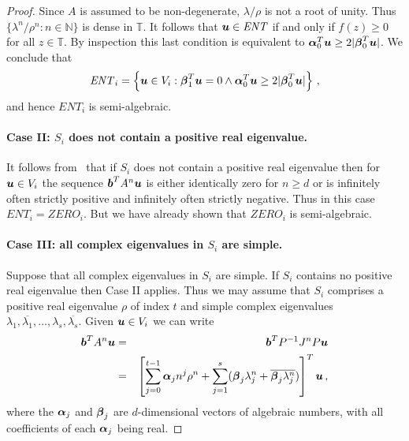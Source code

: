 \begin{proof}
Since $A$ is assumed to be non-degenerate, $\lambda/\rho$ is not a
root of unity.  Thus $\{\lambda^n/\rho^n:n\in\mathbb{N}\}$ is dense in
$\mathbb{T}$.  It follows that $\boldsymbol{u}\in\mathit{ENT}$ if and
only if $f(z)\geq 0$ for all $z\in\mathbb{T}$.  By inspection this
last condition is equivalent to $\boldsymbol{\alpha}_0^T\boldsymbol{u}
\geq 2|\boldsymbol{\beta}_0^T\boldsymbol{u}|$.
We conclude that
\[ \mathit{ENT}_i = \left\{ \boldsymbol{u}\in V_i :
\boldsymbol{\beta}_1^T\boldsymbol{u}=0 \wedge
\boldsymbol{\alpha}_0^T\boldsymbol{u} \geq 2|\boldsymbol{\beta}_0^T\boldsymbol{u}| \right\} \, ,\]
and hence $\mathit{ENT}_i$ is semi-algebraic.

\paragraph{Case II: $S_i$ does not contain a positive real eigenvalue.}
It follows from~\cite[Lemma 4]{Bra06} that if $S_i$ does not contain a
positive real eigenvalue then for $\boldsymbol{u}\in V_i$ the sequence
$\boldsymbol{b}^TA^n\boldsymbol{u}$ is either identically zero for $n\geq
d$ or is infinitely often strictly positive and infinitely often
strictly negative.  Thus in this case
$\mathit{ENT}_i=\mathit{ZERO}_i$.  But we have already shown that
$\mathit{ZERO}_i$ is semi-algebraic.


\paragraph{Case III: all complex eigenvalues in $S_i$ are simple.}
Suppose that all complex eigenvalues in $S_i$ are simple.  If $S_i$
contains no positive real eigenvalue then Case II applies.  Thus we
may assume that $S_i$ comprises a positive real eigenvalue $\rho$ of
index $t$ and simple complex eigenvalues
$\lambda_1,\overline{\lambda_1},\ldots,\lambda_s,\overline{\lambda_s}$.
Given $\boldsymbol{u}\in V_i$ we can write
\begin{eqnarray}
\myvector{b}^TA^n\myvector{u} &=& \myvector{b}^TP^{-1}J^nP\myvector{u}
\notag\\
&=& \left[\sum_{j=0}^{t-1} \myvector{\alpha}_j n^j \rho^n + \sum_{j=1}^s
(\myvector{\beta}_j \lambda_j^n + \overline{\myvector{\beta}_j \lambda^n_j})
\right]^T\myvector{u} \, ,
\label{eq:exp-poly}
\end{eqnarray}
where the $\boldsymbol{\alpha}_j$ and $\boldsymbol{\beta}_j$ are
$d$-dimensional vectors of algebraic numbers, with all coefficients of
each $\boldsymbol{\alpha}_j$ being real.


\end{proof}
